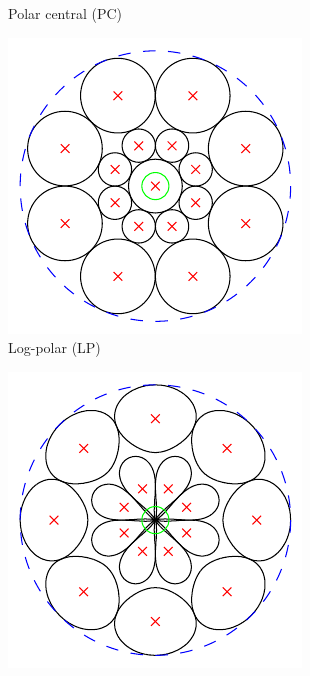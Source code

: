 \documentclass[thesis.tex]{subfiles}
\begin{document}
\begin{figure}[p]
\begin{subfigure}[t]{0.32\textwidth}
		\caption{Polar central (PC)}
		\label{fig:gridTypePc}
	\end{subfigure}
	\begin{subfigure}[t]{0.32\textwidth}
		\includegraphics[width=\textwidth]{img/gridType_log-polar.pdf}
		\caption{Log-polar (LP)}
		\label{fig:gridTypeLp}
	\end{subfigure}
	\begin{subfigure}[t]{0.32\textwidth}
		\includegraphics[width=\textwidth]{img/gridType_concentric_polar_polar_gaussian.pdf}

\end{subfigure}
\end{figure}
\end{document}
